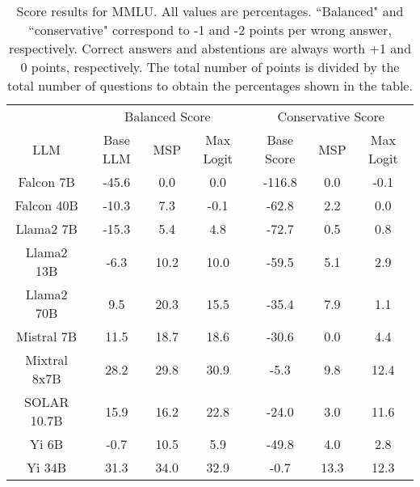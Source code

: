 \renewcommand\arraystretch{1.2}
\begin{table*}
\centering
\begin{tabular}{c|c|c|c|c|c|c}
& \multicolumn{3}{c|}{Balanced Score} & \multicolumn{3}{c}{Conservative Score} \\ 
LLM & Base LLM & MSP & Max Logit & Base Score & MSP & Max Logit\\ \hline
Falcon 7B & -45.6 & 0.0 & 0.0 & -116.8 & 0.0 & -0.1\\
Falcon 40B & -10.3 & 7.3 & -0.1 & -62.8 & 2.2 & 0.0\\
Llama2 7B & -15.3 & 5.4 & 4.8 & -72.7 & 0.5 & 0.8\\
Llama2 13B & -6.3 & 10.2 & 10.0 & -59.5 & 5.1 & 2.9\\
Llama2 70B & 9.5 & 20.3 & 15.5 & -35.4 & 7.9 & 1.1\\
Mistral 7B & 11.5 & 18.7 & 18.6 & -30.6 & 0.0 & 4.4\\
Mixtral 8x7B & 28.2 & 29.8 & 30.9 & -5.3 & 9.8 & 12.4\\
SOLAR 10.7B & 15.9 & 16.2 & 22.8 & -24.0 & 3.0 & 11.6\\
Yi 6B & -0.7 & 10.5 & 5.9 & -49.8 & 4.0 & 2.8\\
Yi 34B & 31.3 & 34.0 & 32.9 & -0.7 & 13.3 & 12.3\\
\hline
\end{tabular}
\caption{Score results for MMLU. All values are percentages. ``Balanced" and ``conservative" correspond to -1 and -2 points per wrong answer, respectively. Correct answers and abstentions are always worth +1 and 0 points, respectively. The total number of points is divided by the total number of questions to obtain the percentages shown in the table.}
\label{tab:mmlu_score}
\end{table*}
